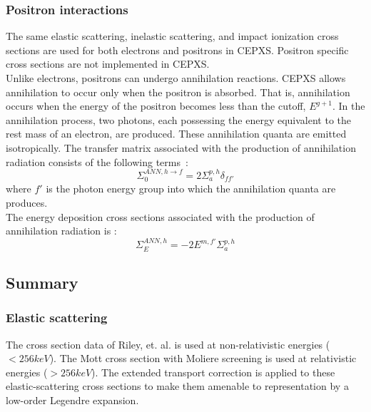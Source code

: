 \subsubsection{Positron interactions}
The same elastic scattering, inelastic scattering, and impact ionization cross
sections are used for both electrons and positrons in CEPXS. Positron specific
cross sections are not implemented in CEPXS.\\
Unlike electrons, positrons can undergo annihilation reactions. CEPXS allows
annihilation to occur only when the positron is absorbed. That is,
annihilation occurs when the energy of the positron becomes less than the
cutoff, $E^{g+1}$. In the annihilation process, two photons, each possessing
the energy equivalent to the rest mass of an electron, are produced. These
annihilation quanta are emitted isotropically. The transfer matrix associated
with the production of annihilation radiation consists of the following
\hbox{terms :}
\begin{equation}
\Sigma_{0}^{ANN,h\rightarrow f} = 2 \Sigma_{a}^{p,h} \delta_{ff'}
\end{equation}
where $f'$ is the photon energy group into which the annihilation quanta are
produces.\\
The energy deposition cross sections associated with the production of annihilation 
radiation is :
\begin{equation}
\Sigma_E^{ANN,h} = -2 E^{m,f'}\Sigma_a^{p,h}
\end{equation}

\subsection{Summary}

\subsubsection{Elastic scattering}
The cross section data of Riley, et. al. is used at non-relativistic energies
($<256 keV$). The Mott cross section with Moliere screening is used at
relativistic energies ($>256keV$). The extended transport correction is applied
to these elastic-scattering cross sections to make them amenable to
representation by a low-order Legendre expansion.

